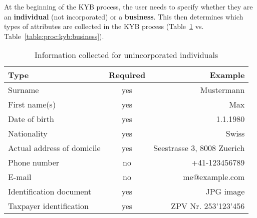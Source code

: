 At the beginning of the KYB process, the user needs to specify whether they
are an {\bf individual} (not incorporated) or a {\bf business}. This then
determines which types of attributes are collected in the KYB process
(Table~\ref{table:proc:kyb:individual} vs. Table~\ref{table:proc:kyb:business}).

\begin{table}
  \caption{Information collected for unincorporated individuals}
  \label{table:proc:kyb:individual}
  \begin{center}
    \begin{tabular}{l|c|r}
      {\bf Type}                 & {\bf Required}    & {\bf Example} \\ \hline \hline
      Surname                    & yes        & Mustermann \\
      First name(s)              & yes        & Max \\
      Date of birth              & yes        & 1.1.1980 \\
      Nationality                & yes        & Swiss \\
      Actual address of domicile & yes        & Seestrasse 3, 8008 Zuerich \\
      Phone number               & no         & +41-123456789 \\
      E-mail                     & no         & me@example.com \\
      Identification document    & yes        & JPG image \\
      Taxpayer identification    & yes        & ZPV Nr. 253'123'456 \\
  \end{tabular}
  \end{center}
\end{table}


